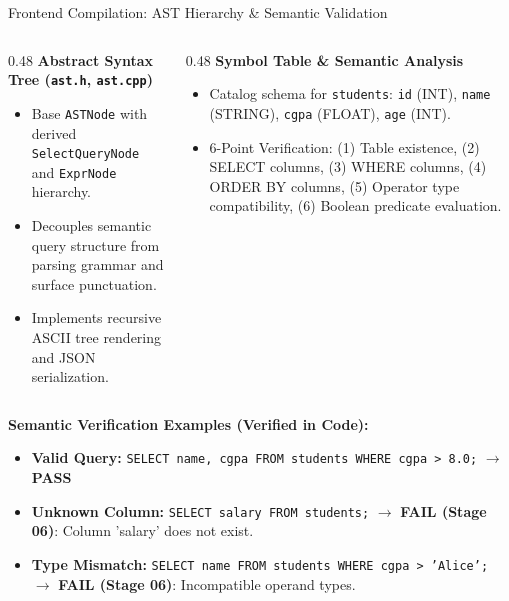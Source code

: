 \documentclass[aspectratio=169,10pt]{beamer}
\begin{document}
\begin{frame}{Frontend Compilation: AST Hierarchy \& Semantic Validation}
    \begin{columns}[T]
        \begin{column}{0.48\textwidth}
            \textbf{Abstract Syntax Tree (\texttt{ast.h}, \texttt{ast.cpp})}
            \begin{itemize}\footnotesize
                \item Base \texttt{ASTNode} with derived \texttt{SelectQueryNode} and \texttt{ExprNode} hierarchy.
                \item Decouples semantic query structure from parsing grammar and surface punctuation.
                \item Implements recursive ASCII tree rendering and JSON serialization.
            \end{itemize}
        \end{column}
        \begin{column}{0.48\textwidth}
            \textbf{Symbol Table \& Semantic Analysis}
            \begin{itemize}\footnotesize
                \item Catalog schema for \texttt{students}: \texttt{id} (INT), \texttt{name} (STRING), \texttt{cgpa} (FLOAT), \texttt{age} (INT).
                \item 6-Point Verification: (1) Table existence, (2) SELECT columns, (3) WHERE columns, (4) ORDER BY columns, (5) Operator type compatibility, (6) Boolean predicate evaluation.
            \end{itemize}
        \end{column}
    \end{columns}
    \vspace{0.6em}
    \textbf{Semantic Verification Examples (Verified in Code):}
    \begin{itemize}\footnotesize
        \item \textbf{Valid Query:} \texttt{SELECT name, cgpa FROM students WHERE cgpa > 8.0;} $\to$ \textbf{PASS}
        \item \textbf{Unknown Column:} \texttt{SELECT salary FROM students;} $\to$ \textbf{FAIL (Stage 06)}: Column 'salary' does not exist.
        \item \textbf{Type Mismatch:} \texttt{SELECT name FROM students WHERE cgpa > 'Alice';} $\to$ \textbf{FAIL (Stage 06)}: Incompatible operand types.
    \end{itemize}
\end{frame}
\end{document}

